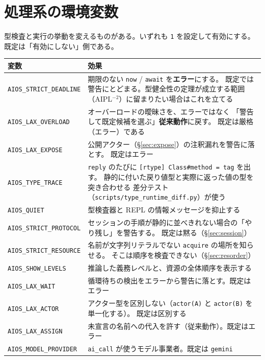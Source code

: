 \documentclass[11pt,a4paper]{ltjsarticle}
\begin{document}
\section{処理系の環境変数}

\label{sec:envvars}

型検査と実行の挙動を変えるものがある。いずれも \texttt{1} を設定して有効にする。
既定は「有効にしない」側である。

\begin{center}
\small
\begin{tabular}{@{}lp{9.4cm}@{}}
\toprule
変数 & 効果 \\
\midrule
\texttt{AIOS\_STRICT\_DEADLINE} &
  期限のない \texttt{now} / \texttt{await} を\textbf{エラー}にする。
  既定では警告にとどまる。型健全性の定理が成立する範囲
  （AIPL$^{-2}$）に留まりたい場合はこれを立てる \\
\texttt{AIOS\_LAX\_OVERLOAD} &
  オーバーロードの曖昧さを、エラーではなく
  「警告して既定候補を選ぶ」\textbf{従来動作}に戻す。
  既定は厳格（エラー）である \\
\texttt{AIOS\_LAX\_EXPOSE} &
  公開アクター（\S\ref{sec:expose}）の注釈漏れを警告に落とす。
  既定はエラー \\
\texttt{AIOS\_TYPE\_TRACE} &
  \texttt{reply} のたびに \texttt{[rtype] Class\#method = tag} を出す。
  静的に付いた戻り値型と実際に返った値の型を突き合わせる
  差分テスト（\texttt{scripts/type\_runtime\_diff.py}）が使う \\
\texttt{AIOS\_QUIET} &
  型検査器と REPL の情報メッセージを抑止する \\
\texttt{AIOS\_STRICT\_PROTOCOL} &
  セッションの手順が静的に並べきれない場合の「やり残し」を警告する。
  既定は黙る（\S\ref{sec:session}） \\
\texttt{AIOS\_STRICT\_RESOURCE} &
  名前が文字列リテラルでない \texttt{acquire} の場所を知らせる。
  そこは順序を検査できない（\S\ref{sec:resorder}） \\
\texttt{AIOS\_SHOW\_LEVELS} &
  推論した義務レベルと、資源の全体順序を表示する \\
\texttt{AIOS\_LAX\_WAIT} &
  循環待ちの検出をエラーから警告に落とす。既定はエラー \\
\texttt{AIOS\_LAX\_ACTOR} &
  アクター型を区別しない（\texttt{actor(A)} と \texttt{actor(B)} を単一化する）。
  既定は区別する \\
\texttt{AIOS\_LAX\_ASSIGN} &
  未宣言の名前への代入を許す（従来動作）。既定はエラー \\
\texttt{AIOS\_MODEL\_PROVIDER} &
  \texttt{ai\_call} が使うモデル事業者。既定は \texttt{gemini} \\
\bottomrule
\end{tabular}
\end{center}
\end{document}
